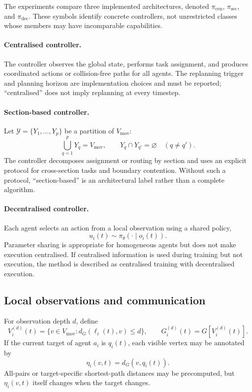 \documentclass[../main.tex]{subfiles}
\begin{document}
The experiments compare three implemented architectures, denoted
\(\pi_{\mathrm{cen}}\), \(\pi_{\mathrm{sec}}\), and \(\pi_{\mathrm{dec}}\).
These symbols identify concrete controllers, not unrestricted classes whose
members may have incomparable capabilities.

\paragraph{Centralised controller.}
The controller observes the global state, performs task assignment, and
produces coordinated actions or collision-free paths for all agents. The
replanning trigger and planning horizon are implementation choices and must be
reported; ``centralised'' does not imply replanning at every timestep.

\paragraph{Section-based controller.}
Let \(\mathcal{Y}=\{Y_1,\ldots,Y_p\}\) be a partition of
\(V_{\mathrm{mov}}\):
\[
\bigcup_{q=1}^{p}Y_q=V_{\mathrm{mov}},
\qquad Y_q\cap Y_{q'}=\varnothing\quad(q\neq q').
\]
The controller decomposes assignment or routing by section and uses an
explicit protocol for cross-section tasks and boundary contention. Without
such a protocol, ``section-based'' is an architectural label rather than a
complete algorithm.

\paragraph{Decentralised controller.}
Each agent selects an action from a local observation using a shared policy,
\[
u_i(t)\sim\pi_\theta(\cdot\mid o_i(t)).
\]
Parameter sharing is appropriate for homogeneous agents but does not make
execution centralised. If centralised information is used during training but
not execution, the method is described as centralised training with
decentralised execution.

\subsection{Local observations and communication}

For observation depth \(d\), define
\[
V_i^{(d)}(t)=\{v\in V_{\mathrm{mov}}:d_G(\ell_i(t),v)\leq d\},
\qquad
G_i^{(d)}(t)=G[V_i^{(d)}(t)].
\]
If the current target of agent \(a_i\) is \(q_i(t)\), each visible vertex may
be annotated by
\[
\eta_i(v,t)=d_G(v,q_i(t)).
\]
All-pairs or target-specific shortest-path distances may be precomputed, but
\(\eta_i(v,t)\) itself changes when the target changes.
\end{document}
